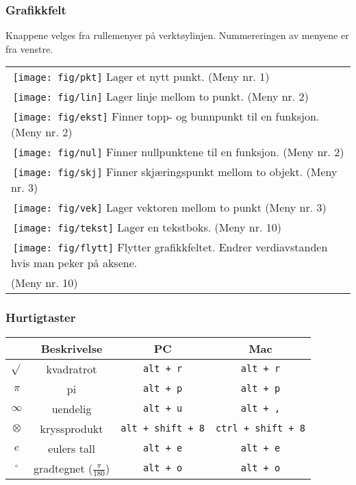 \subsubsection*{Grafikkfelt}
Knappene velges fra rullemenyer på verktøylinjen. Nummereringen av menyene er fra venstre.\vsk

\begin{tabular}{@{}l}
	\,\texttt{[image: fig/pkt]} Lager et nytt punkt. (Meny nr. 1) \\
	\,\texttt{[image: fig/lin]} Lager linje mellom to punkt. (Meny nr. 2)\\	
	\,\texttt{[image: fig/ekst]} Finner topp- og bunnpunkt til en funksjon. (Meny nr. 2)\\
	\,\texttt{[image: fig/nul]} Finner nullpunktene til en funksjon. (Meny nr. 2)	\\
	\,\texttt{[image: fig/skj]} Finner skjæringspunkt mellom to objekt. (Meny nr. 3)\\	
	\,\texttt{[image: fig/vek]} Lager vektoren mellom to punkt (Meny nr. 3)\\		
	\,\texttt{[image: fig/tekst]} Lager en tekstboks. (Meny nr. 10)\\		
	\,\texttt{[image: fig/flytt]} Flytter grafikkfeltet. Endrer verdiavstanden hvis man peker på aksene. \\
	\hspace{1cm}(Meny nr. 10)\\			
\end{tabular}

\subsubsection{Hurtigtaster}
\begin{tabular}{@{}c | c |c | c }
	&\textbf{Beskrivelse} & \textbf{PC }& \textbf{Mac} \\ \hline
	$ \sqrt{} $	& kvadratrot& \texttt{alt\,+\,r} &\texttt{alt\,+\,r} \\\hline
	$ \pi $	& pi& \texttt{alt\,+\,p} & \texttt{alt\,+\,p}\\\hline
	$ \infty $ &uendelig& \texttt{alt\,+\,u} &\texttt{alt\,+\,,}  \\\hline
	$ \otimes $&kryssprodukt & \texttt{alt\,+\,shift\,+\,8}&\texttt{ctrl\,+\,shift\,+\,8} \\\hline
	$ e $&eulers tall & \texttt{alt\,+\,e}& \texttt{alt\,+\,e}\\\hline
	$ {}^\circ $&gradtegnet ($ \frac{\pi}{180} $) & \texttt{alt\,+\,o}& \texttt{alt\,+\,o}
	\\\hline	
\end{tabular}
\newpage
